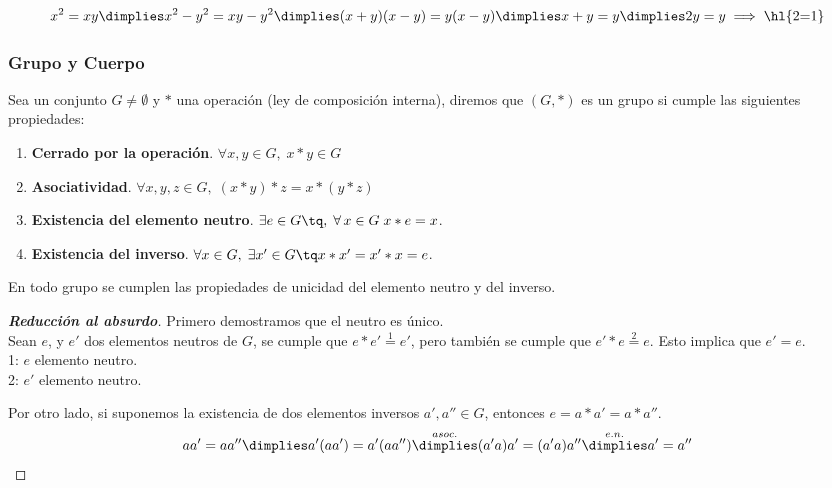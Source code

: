 \[
x^2 = xy \dimplies x^2-y^2 = xy-y^2 \dimplies (x+y)(x-y) = y(x-y) \dimplies x+y = y \dimplies 2y = y \implies \text{\hl{2=1}}
\]




\subsubsection{Grupo y Cuerpo}

\begin{defn}[Grupo]
Sea un conjunto $G\neq \emptyset$ y $\ast$ una operación (ley de composición interna), diremos que $(G,\ast)$ es un grupo si cumple las siguientes propiedades:
\begin{enumerate}
	\item \textbf{Cerrado por la operación}. $\forall x, y \in G, \; x \ast y \in G$
	\item \textbf{Asociatividad}. $\forall x, y, z \in G, \; (x \ast y) \ast z = x \ast (y \ast z)$
	\item \textbf{Existencia del elemento neutro}. $\exists  e \in G \tq ,\; \forall\, x\in G\; x\ast e=x$.
	\item \textbf{Existencia del inverso}. $\forall x \in G ,\; \exists x' \in G \tq x\ast x'=x'\ast x=e$.
\end{enumerate}
\end{defn}

\begin{prop}
  En todo grupo se cumplen las propiedades de unicidad del elemento neutro y del inverso.
\end{prop}

\begin{proof}[\textbf{Reducción al absurdo}]
Primero demostramos que el neutro es único. \\
Sean $e$, y $e'$ dos elementos neutros de $G$, se cumple que $e\ast e'\overset{1}{=}e'$, pero también se cumple que $e'\ast e\overset{2}{=}e$. Esto implica que $e'=e$.\\
1: $e$ elemento neutro.\\
2: $e'$ elemento neutro.

Por otro lado, si suponemos la existencia de dos elementos inversos $a',a''\in G$, entonces $e=a\ast a'=a\ast a''$. \\

\[
	aa' = aa'' \dimplies a'(aa') = a'(aa'') \overset{asoc.}{\dimplies} (a'a)a'=(a'a)a'' \overset{e.n.}{\dimplies} a'=a'' 
\]
\end{proof}

